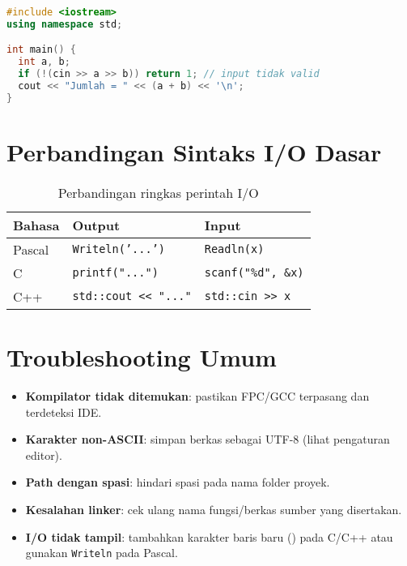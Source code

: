 \documentclass[../main.tex]{subfiles}
\begin{document}
\begin{lstlisting}[language=C++, caption={Menjumlah dua bilangan pada C++}]
#include <iostream>
using namespace std;

int main() {
  int a, b;
  if (!(cin >> a >> b)) return 1; // input tidak valid
  cout << "Jumlah = " << (a + b) << '\n';
}
\end{lstlisting}

\section{Perbandingan Sintaks I/O Dasar}
\begin{table}[H]
  \centering
  \caption{Perbandingan ringkas perintah I/O}
  \label{tab:io-basic}
  \begin{tabular}{@{}lll@{}}
    \toprule
    Bahasa & Output & Input \\
    \midrule
    Pascal & \texttt{Writeln('...')} & \texttt{Readln(x)} \\
    C      & \texttt{printf("...")} & \texttt{scanf("\%d", \&x)} \\
    C++    & \texttt{std::cout << "..."} & \texttt{std::cin >> x} \\
    \bottomrule
  \end{tabular}
\end{table}

\section{Troubleshooting Umum}
\begin{itemize}
  \item \textbf{Kompilator tidak ditemukan}: pastikan FPC/GCC terpasang dan terdeteksi IDE.
  \item \textbf{Karakter non-ASCII}: simpan berkas sebagai UTF-8 (lihat pengaturan editor).
  \item \textbf{Path dengan spasi}: hindari spasi pada nama folder proyek.
  \item \textbf{Kesalahan linker}: cek ulang nama fungsi/berkas sumber yang disertakan.
  \item \textbf{I/O tidak tampil}: tambahkan karakter baris baru (\texttt{\n}) pada C/C++ atau gunakan \texttt{Writeln} pada Pascal.
\end{itemize}
\end{document}
